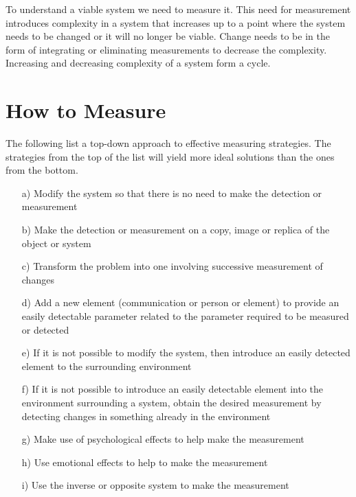 \documentclass[12pt,a4paper]{article}
\begin{document}
To understand a viable system we need to measure it. This need for measurement introduces complexity in a system that increases up to a point where the system needs to be changed or it will no longer be viable. Change needs to be in the form of integrating or eliminating measurements to decrease the complexity. Increasing and decreasing complexity of a system form a cycle.


\section{How to Measure}
The following list a top-down approach to effective measuring strategies. The strategies from the top of the list will yield more ideal solutions than the ones from the bottom.

\begin{itemize}
	\item[a)] Modify the system so that there is no need to make the detection or measurement
	\item[b)] Make the detection or measurement on a copy, image or replica of the object or system
	\item[c)] Transform the problem into one involving successive measurement of changes
	\item[d)] Add a new element (communication or person or element) to provide an easily detectable parameter related to the parameter required to be measured or detected
	\item[e)] If it is not possible to modify the system, then introduce an easily detected element to the surrounding environment
	\item[f)] If it is not possible to introduce an easily detectable element into the environment surrounding a system, obtain the desired measurement by detecting changes in something already in the environment
	\item[g)] Make use of psychological effects to help make the measurement
	\item[h)] Use emotional effects to help to make the measurement
	\item[i)] Use the inverse or opposite system to make the measurement
\end{itemize}
\end{document}
